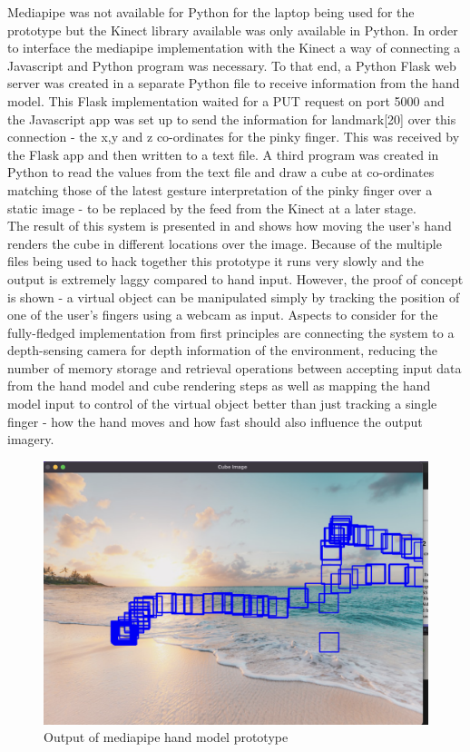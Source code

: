 Mediapipe was not available for Python for the laptop being used for the prototype but the Kinect library available was only available in Python. In order to interface the mediapipe implementation with the Kinect a way of connecting a Javascript and Python program was necessary. To that end, a Python Flask web server was created in a separate Python file to receive information from the hand model. This Flask implementation waited for a PUT request on port 5000 and the Javascript app was set up to send the information for landmark[20] over this connection - the x,y and z co-ordinates for the pinky finger. This was received by the Flask app and then written to a text file. A third program was created in Python to read the values from the text file and draw a cube at co-ordinates matching those of the latest gesture interpretation of the pinky finger over a static image - to be replaced by the feed from the Kinect at a later stage. \\

The result of this system is presented in  and shows how moving the user's hand renders the cube in different locations over the image. Because of the multiple files being used to hack together this prototype it runs very slowly and the output is extremely laggy compared to hand input. However, the proof of concept is shown - a virtual object can be manipulated simply by tracking the position of one of the user's fingers using a webcam as input. Aspects to consider for the fully-fledged implementation from first principles are connecting the system to a depth-sensing camera for depth information of the environment, reducing the number of memory storage and retrieval operations between accepting input data from the hand model and cube rendering steps as well as mapping the hand model input to control of the virtual object better than just tracking a single finger - how the hand moves and how fast should also influence the output imagery. \\ 

\begin{figure}[h]
    \centering
    \includegraphics[width=0.7\linewidth]{figures/mediapipe_prototype_output.png}
    \caption{Output of mediapipe hand model prototype}
    \label{fig:mediapipe_prototype_output}
\end{figure}

